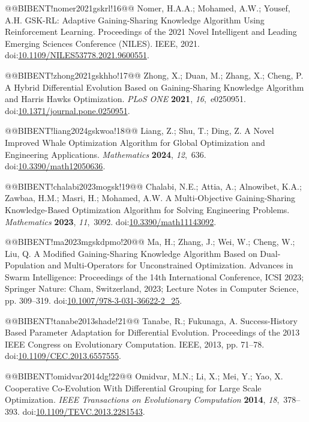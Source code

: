 \documentclass[10pt,a4paper]{article}
\begin{document}
@@BIBENT!nomer2021gskrl!16@@ Nomer, H.A.A.; Mohamed, A.W.; Yousef, A.H. {GSK-RL}: Adaptive Gaining-Sharing Knowledge Algorithm Using Reinforcement Learning. Proceedings of the 2021 Novel Intelligent and Leading Emerging Sciences Conference (NILES). IEEE, 2021. doi:{\href{https://doi.org/10.1109/NILES53778.2021.9600551}{10.1109/NILES53778.2021.9600551}}.

@@BIBENT!zhong2021gskhho!17@@ Zhong, X.; Duan, M.; Zhang, X.; Cheng, P. A Hybrid Differential Evolution Based on Gaining-Sharing Knowledge Algorithm and Harris Hawks Optimization. \emph{PLoS ONE} \textbf{2021}, \emph{16},~e0250951. doi:{\href{https://doi.org/10.1371/journal.pone.0250951}{10.1371/journal.pone.0250951}}.

@@BIBENT!liang2024gskwoa!18@@ Liang, Z.; Shu, T.; Ding, Z. A Novel Improved Whale Optimization Algorithm for Global Optimization and Engineering Applications. \emph{Mathematics} \textbf{2024}, \emph{12},~636. doi:{\href{https://doi.org/10.3390/math12050636}{10.3390/math12050636}}.

@@BIBENT!chalabi2023mogsk!19@@ Chalabi, N.E.; Attia, A.; Alnowibet, K.A.; Zawbaa, H.M.; Masri, H.; Mohamed, A.W. A Multi-Objective Gaining-Sharing Knowledge-Based Optimization Algorithm for Solving Engineering Problems. \emph{Mathematics} \textbf{2023}, \emph{11},~3092. doi:{\href{https://doi.org/10.3390/math11143092}{10.3390/math11143092}}.

@@BIBENT!ma2023mgskdpmo!20@@ Ma, H.; Zhang, J.; Wei, W.; Cheng, W.; Liu, Q. A Modified Gaining-Sharing Knowledge Algorithm Based on Dual-Population and Multi-Operators for Unconstrained Optimization. Advances in Swarm Intelligence: Proceedings of the 14th International Conference, ICSI 2023; Springer Nature: Cham, Switzerland, 2023; Lecture Notes in Computer Science, pp. 309--319. doi:{\href{https://doi.org/10.1007/978-3-031-36622-2_25}{10.1007/978-3-031-36622-2_25}}.

@@BIBENT!tanabe2013shade!21@@ Tanabe, R.; Fukunaga, A. Success-History Based Parameter Adaptation for Differential Evolution. Proceedings of the 2013 IEEE Congress on Evolutionary Computation. IEEE, 2013, pp. 71--78. doi:{\href{https://doi.org/10.1109/CEC.2013.6557555}{10.1109/CEC.2013.6557555}}.

@@BIBENT!omidvar2014dg!22@@ Omidvar, M.N.; Li, X.; Mei, Y.; Yao, X. Cooperative Co-Evolution With Differential Grouping for Large Scale Optimization. \emph{IEEE Transactions on Evolutionary Computation} \textbf{2014}, \emph{18},~378--393. doi:{\href{https://doi.org/10.1109/TEVC.2013.2281543}{10.1109/TEVC.2013.2281543}}.
\end{document}
